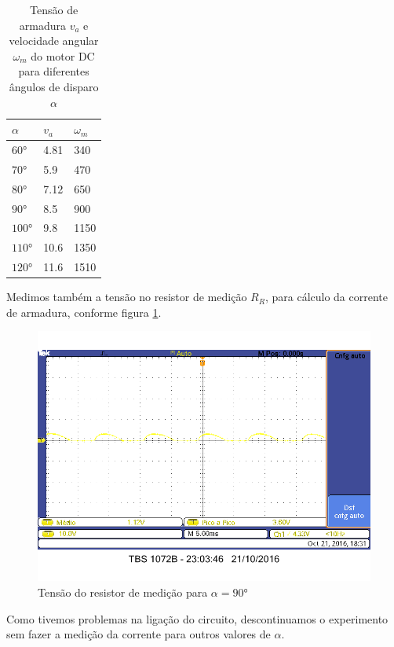 \documentclass{article}
\begin{document}
\begin{table}[H]
	\centering
	\caption{Tensão de armadura $v_a$ e velocidade angular $\omega_m$ do motor DC para diferentes ângulos de disparo $\alpha$}
	\label{tab:varet}
	\begin{tabular}{|l|l|l|}
		\hline
		$\alpha$ & $v_a$ & $\omega_m$ \\ \hline
		$60°$    & 4.81  & 340        \\ \hline
		$70°$    & 5.9   & 470        \\ \hline
		$80°$    & 7.12  & 650        \\ \hline
		$90°$    & 8.5   & 900        \\ \hline
		$100°$   & 9.8   & 1150       \\ \hline
		$110°$   & 10.6  & 1350       \\ \hline
		$120°$   & 11.6  & 1510       \\ \hline
	\end{tabular}
\end{table}

Medimos também a tensão no resistor de medição $R_R$, para cálculo da corrente de armadura, conforme figura \ref{fig:iaret}.
\begin{figure}[H]
	\centering
	\includegraphics[width=\linewidth]{Dados/Retificador/corrente.bmp}
	\caption{Tensão do resistor de medição para $\alpha=90°$}
	\label{fig:iaret}
\end{figure}

Como tivemos problemas na ligação do circuito, descontinuamos o experimento sem fazer a medição da corrente para outros valores de $\alpha$.
\end{document}
